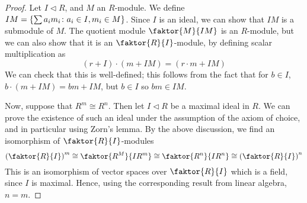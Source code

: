 \begin{proof}
	Let \( I \triangleleft R \), and \( M \) an \( R \)-module.
	We define \( IM = \qty{\sum a_i m_i \colon a_i \in I, m_i \in M} \).
	Since \( I \) is an ideal, we can show that \( IM \) is a submodule of \( M \).
	The quotient module \( \faktor{M}{IM} \) is an \( R \)-module, but we can also show that it is an \( \faktor{R}{I} \)-module, by defining scalar multiplication as
	\[
		(r+I) \cdot (m+IM) = (r \cdot m + IM)
	\]
	We can check that this is well-defined; this follows from the fact that for \( b \in I \), \( b \cdot (m + IM) = bm + IM \), but \( b \in I \) so \( bm \in IM \).

	Now, suppose that \( R^m \cong R^n \).
	Then let \( I \triangleleft R \) be a maximal ideal in \( R \).
	We can prove the existence of such an ideal under the assumption of the axiom of choice, and in particular using Zorn's lemma.
	By the above discussion, we find an isomorphism of \( \faktor{R}{I} \)-modules
	\[
		\qty(\faktor{R}{I})^m \cong \faktor{R^M}{IR^m} \cong \faktor{R^n}{IR^n} \cong \qty(\faktor{R}{I})^n
	\]
	This is an isomorphism of vector spaces over \( \faktor{R}{I} \) which is a field, since \( I \) is maximal.
	Hence, using the corresponding result from linear algebra, \( n = m \).
\end{proof}

